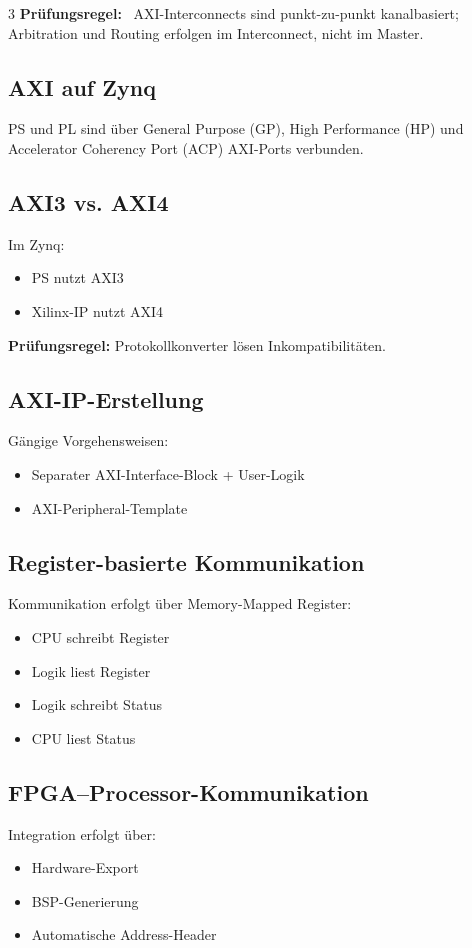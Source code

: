 \documentclass[10pt,a4paper]{article}
\newcommand{\prule}[1]{\textbf{\textcolor{examBlue}{Prüfungsregel:}}~#1}
\newcommand{\hilite}[1]{\colorbox{yellow!25}{#1}}
\newcommand{\imp}[1]{\textbf{\textcolor{codeemph}{#1}}}
\begin{document}
\begin{multicols}{3}
\prule{%
AXI-Interconnects sind 
punkt-zu-punkt kanalbasiert; 
Arbitration und Routing erfolgen im Interconnect, nicht im Master.
}

\subsection{AXI auf Zynq}
PS und PL sind über General Purpose (GP), High Performance (HP) und Accelerator Coherency Port (ACP) AXI-Ports verbunden.


\subsection{AXI3 vs. AXI4}
Im Zynq:
\begin{itemize}
  \item PS nutzt AXI3
  \item Xilinx-IP nutzt AXI4
\end{itemize}

\imp{Prüfungsregel:}  
\hilite{Protokollkonverter} \hilite{lösen} \hilite{Inkompatibilitäten}.

\subsection{AXI-IP-Erstellung}
Gängige Vorgehensweisen:
\begin{itemize}
  \item Separater AXI-Interface-Block + User-Logik
  \item AXI-Peripheral-Template
\end{itemize}

\subsection{Register-basierte Kommunikation}
Kommunikation erfolgt über Memory-Mapped Register:

\begin{itemize}
  \item CPU schreibt Register
  \item Logik liest Register
  \item Logik schreibt Status
  \item CPU liest Status
\end{itemize}

\subsection{FPGA–Processor-Kommunikation}
Integration erfolgt über:
\begin{itemize}
  \item Hardware-Export
  \item BSP-Generierung
  \item Automatische Address-Header
\end{itemize}


\end{multicols}
\end{document}
